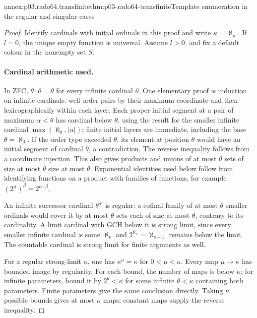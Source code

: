 \begin{annexitem}{annex:p03.rado64.transfinite}{thm:p03-rado64-transfinite}{Template enumeration in the regular and singular cases}
\begin{proof}
Identify cardinals with initial ordinals in this proof and write
\(\kappa=\aleph_n\). If \(l=0\), the unique empty function is universal.
Assume \(l>0\), and fix a default colour in the nonempty set \(S\).

\paragraph{Cardinal arithmetic used.}
In ZFC, \(\theta\cdot\theta=\theta\) for every infinite cardinal \(\theta\).
One elementary proof is induction on infinite cardinals: well-order pairs
by their maximum coordinate and then lexicographically within each layer.
Each proper initial segment at a pair of maximum \(\alpha<\theta\)
has cardinal below \(\theta\), using the result for the smaller infinite
cardinal \(\max(\aleph_0,|\alpha|)\); finite initial layers are immediate,
including the base \(\theta=\aleph_0\).
If the order type exceeded \(\theta\), its element at position \(\theta\)
would have an initial segment of cardinal \(\theta\), a contradiction.
The reverse inequality follows from a coordinate injection.
This also gives products and unions of at most \(\theta\) sets of size
at most \(\theta\) size at most \(\theta\).
Exponential identities used below follow from identifying functions on a
product with families of functions, for example
\((2^\alpha)^\beta=2^{\alpha\cdot\beta}\).

An infinite successor cardinal \(\theta^+\) is regular: a cofinal family
of at most \(\theta\) smaller ordinals would cover it by at most \(\theta\)
sets each of size at most \(\theta\), contrary to its cardinality.
A limit cardinal with GCH below it is strong limit, since every smaller
infinite cardinal is some \(\aleph_\nu\) and
\(2^{\aleph_\nu}=\aleph_{\nu+1}\) remains below the limit.
The countable cardinal is strong limit for finite arguments as well.

For a regular strong-limit \(\kappa\), one has
\(\kappa^\mu=\kappa\) for \(0<\mu<\kappa\).
Every map \(\mu\to\kappa\) has bounded image by regularity.
For each bound, the number of maps is below \(\kappa\):
for infinite parameters, bound it by \(2^\theta<\kappa\) for some
infinite \(\theta<\kappa\) containing both parameters.
Finite parameters give the same conclusion directly.
Taking \(\kappa\) possible bounds gives at most \(\kappa\) maps;
constant maps supply the reverse inequality.


\end{proof}
\end{annexitem}
